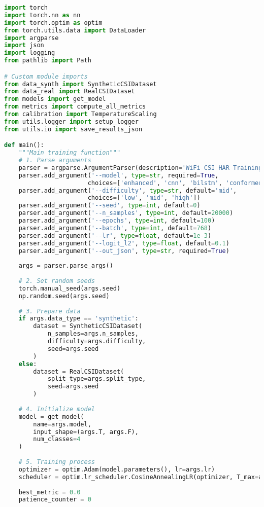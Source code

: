 \begin{lstlisting}[language=Python,caption=Training and Evaluation Main Program Structure]
import torch
import torch.nn as nn
import torch.optim as optim
from torch.utils.data import DataLoader
import argparse
import json
import logging
from pathlib import Path

# Custom module imports
from data_synth import SyntheticCSIDataset
from data_real import RealCSIDataset
from models import get_model
from metrics import compute_all_metrics
from calibration import TemperatureScaling
from utils.logger import setup_logger
from utils.io import save_results_json

def main():
    """Main training function"""
    # 1. Parse arguments
    parser = argparse.ArgumentParser(description='WiFi CSI HAR Training')
    parser.add_argument('--model', type=str, required=True,
                       choices=['enhanced', 'cnn', 'bilstm', 'conformer_lite'])
    parser.add_argument('--difficulty', type=str, default='mid',
                       choices=['low', 'mid', 'high'])
    parser.add_argument('--seed', type=int, default=0)
    parser.add_argument('--n_samples', type=int, default=20000)
    parser.add_argument('--epochs', type=int, default=100)
    parser.add_argument('--batch', type=int, default=768)
    parser.add_argument('--lr', type=float, default=1e-3)
    parser.add_argument('--logit_l2', type=float, default=0.1)
    parser.add_argument('--out_json', type=str, required=True)
    
    args = parser.parse_args()
    
    # 2. Set random seeds
    torch.manual_seed(args.seed)
    np.random.seed(args.seed)
    
    # 3. Prepare data
    if args.data_type == 'synthetic':
        dataset = SyntheticCSIDataset(
            n_samples=args.n_samples,
            difficulty=args.difficulty,
            seed=args.seed
        )
    else:
        dataset = RealCSIDataset(
            split_type=args.split_type,
            seed=args.seed
        )
    
    # 4. Initialize model
    model = get_model(
        name=args.model,
        input_shape=(args.T, args.F),
        num_classes=4
    )
    
    # 5. Training process
    optimizer = optim.Adam(model.parameters(), lr=args.lr)
    scheduler = optim.lr_scheduler.CosineAnnealingLR(optimizer, T_max=args.epochs)
    
    best_metric = 0.0
    patience_counter = 0
    

\end{lstlisting}
